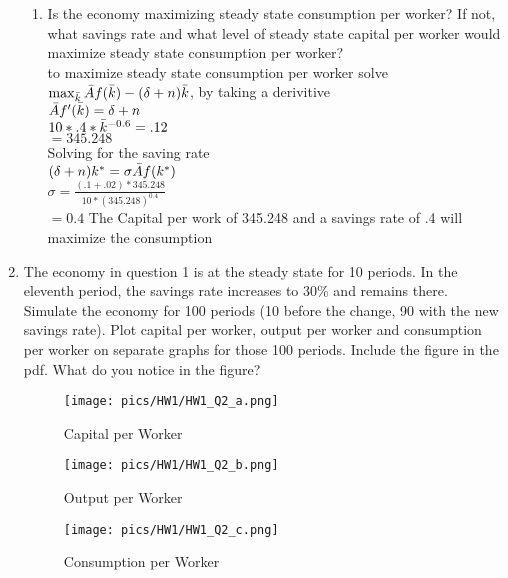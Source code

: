\documentclass[12pt,oneside,reqno]{amsart}
\begin{document}
\begin{enumerate}
\begin{enumerate}
        \item Is the economy maximizing steady state consumption per worker? If not, what savings rate and what level of steady state capital per worker would maximize steady state consumption per worker?\\
        to maximize steady state consumption per worker solve\\ $\max_{\Bar{k}} \Bar{A}f(\Bar{k})-(\delta+n)\Bar{k}$, by taking a derivitive\\
        $\Bar{A}f'(\Bar{k})=\delta+n$\\
        $10*.4*\Bar{k}^{-0.6}=.12$\\
        $=345.248$\\
        Solving for the saving rate\\
        $(\delta+n)k^*=\sigma\Bar{A}f(k^*)$\\
        $\sigma = \frac{(.1+.02)*345.248}{10*(345.248)^{0.4}}$\\
        $=0.4$ 
        The Capital per work of 345.248 and a savings rate of .4 will maximize the consumption
    \end{enumerate}
    \item The economy in question 1 is at the steady state for 10 periods. In the eleventh period, the savings rate increases to 30\% and remains there. Simulate the economy for 100 periods (10 before the change, 90 with the new savings rate). Plot capital per worker, output per worker and consumption per worker on separate graphs for those 100 periods. Include the figure in the pdf. What do you notice in the figure?
    \begin{figure}[h]
        \centering
        \texttt{[image: pics/HW1/HW1\_Q2\_a.png]}
        \caption{Capital per Worker}
    \end{figure}
    \vspace{-.5cm}
    \begin{figure}[h]
        \centering
        \texttt{[image: pics/HW1/HW1\_Q2\_b.png]}
        \caption{Output per Worker}
    \end{figure}
    \begin{figure}[h]
        \centering
        \texttt{[image: pics/HW1/HW1\_Q2\_c.png]}
        \caption{Consumption per Worker}
    \end{figure}

\end{enumerate}
\end{document}
